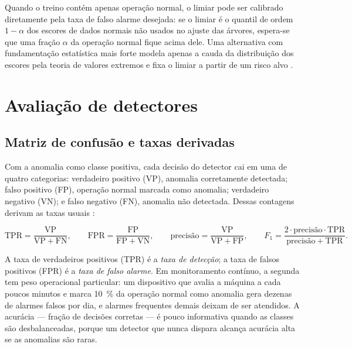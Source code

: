 Quando o treino contém apenas operação normal, o limiar pode ser calibrado diretamente pela
taxa de falso alarme desejada: se o limiar é o quantil de ordem $1-\alpha$ dos escores de
dados normais não usados no ajuste das árvores, espera-se que uma fração $\alpha$ da
operação normal fique acima dele. Uma alternativa com fundamentação estatística mais forte
modela apenas a cauda da distribuição dos escores pela teoria de valores extremos e fixa o
limiar a partir de um risco alvo \cite{siffer2017}.

\section{Avaliação de detectores}
\label{sec:fund-avaliacao}

\subsection{Matriz de confusão e taxas derivadas}

Com a anomalia como classe positiva, cada decisão do detector cai em uma de quatro
categorias: verdadeiro positivo (VP), anomalia corretamente detectada; falso positivo (FP),
operação normal marcada como anomalia; verdadeiro negativo (VN); e falso negativo (FN),
anomalia não detectada. Dessas contagens derivam as taxas usuais \cite{fawcett2006}:

\begin{equation}
\mathrm{TPR} = \frac{\mathrm{VP}}{\mathrm{VP} + \mathrm{FN}},
\qquad
\mathrm{FPR} = \frac{\mathrm{FP}}{\mathrm{FP} + \mathrm{VN}},
\qquad
\mathrm{precisão} = \frac{\mathrm{VP}}{\mathrm{VP} + \mathrm{FP}},
\qquad
F_1 = \frac{2\cdot \mathrm{precisão} \cdot \mathrm{TPR}}{\mathrm{precisão} + \mathrm{TPR}}.
\label{eq:fund-taxas}
\end{equation}

A taxa de verdadeiros positivos (TPR) é a \emph{taxa de detecção}; a taxa de falsos
positivos (FPR) é a \emph{taxa de falso alarme}. Em monitoramento contínuo, a segunda tem
peso operacional particular: um dispositivo que avalia a máquina a cada poucos minutos e
marca \SI{10}{\percent} da operação normal como anomalia gera dezenas de alarmes falsos por
dia, e alarmes frequentes demais deixam de ser atendidos. A acurácia --- fração de decisões
corretas --- é pouco informativa quando as classes são desbalanceadas, porque um detector
que nunca dispara alcança acurácia alta se as anomalias são raras.

